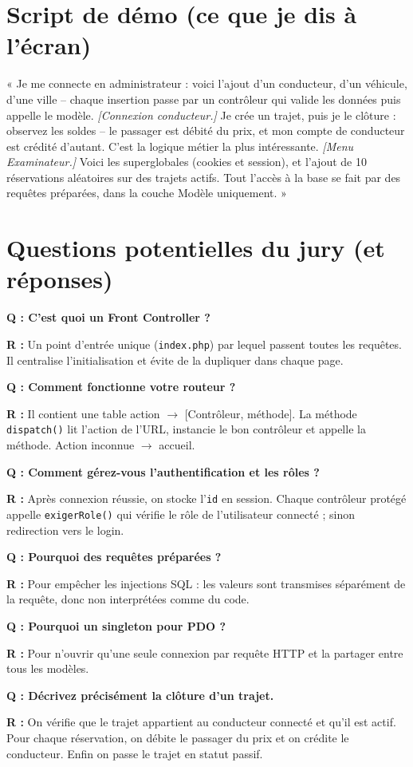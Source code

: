 \documentclass[11pt,a4paper]{article}
\newcommand{\question}[1]{\vspace{0.4em}\noindent\textbf{\color{rouge}Q : #1}\par}
\newcommand{\reponse}[1]{\noindent\textbf{R :} #1\par\vspace{0.4em}}
\begin{document}
\section{Script de démo (ce que je dis à l'écran)}
« Je me connecte en administrateur : voici l'ajout d'un conducteur, d'un véhicule,
d'une ville -- chaque insertion passe par un contrôleur qui valide les données puis
appelle le modèle. \emph{[Connexion conducteur.]} Je crée un trajet, puis je le
clôture : observez les soldes -- le passager est débité du prix, et mon compte de
conducteur est crédité d'autant. C'est la logique métier la plus intéressante.
\emph{[Menu Examinateur.]} Voici les superglobales (cookies et session), et l'ajout
de 10 réservations aléatoires sur des trajets actifs. Tout l'accès à la base se
fait par des requêtes préparées, dans la couche Modèle uniquement. »

\section{Questions potentielles du jury (et réponses)}

\question{C'est quoi un Front Controller ?}
\reponse{Un point d'entrée unique (\texttt{index.php}) par lequel passent toutes les
requêtes. Il centralise l'initialisation et évite de la dupliquer dans chaque page.}

\question{Comment fonctionne votre routeur ?}
\reponse{Il contient une table action $\rightarrow$ [Contrôleur, méthode]. La
méthode \texttt{dispatch()} lit l'action de l'URL, instancie le bon contrôleur et
appelle la méthode. Action inconnue $\rightarrow$ accueil.}

\question{Comment gérez-vous l'authentification et les rôles ?}
\reponse{Après connexion réussie, on stocke l'\texttt{id} en session. Chaque
contrôleur protégé appelle \texttt{exigerRole()} qui vérifie le rôle de
l'utilisateur connecté ; sinon redirection vers le login.}

\question{Pourquoi des requêtes préparées ?}
\reponse{Pour empêcher les injections SQL : les valeurs sont transmises séparément
de la requête, donc non interprétées comme du code.}

\question{Pourquoi un singleton pour PDO ?}
\reponse{Pour n'ouvrir qu'une seule connexion par requête HTTP et la partager entre
tous les modèles.}

\question{Décrivez précisément la clôture d'un trajet.}
\reponse{On vérifie que le trajet appartient au conducteur connecté et qu'il est
actif. Pour chaque réservation, on débite le passager du prix et on crédite le
conducteur. Enfin on passe le trajet en statut passif.}
\end{document}
